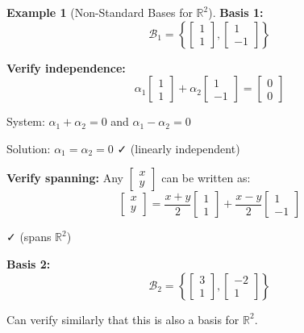 \documentclass[12pt,a4paper]{article}
\theoremstyle{definition}
\newtheorem{example}{Example}[section]
\begin{document}
\begin{example}[Non-Standard Bases for $\mathbb{R}^2$]
\textbf{Basis 1:}
\begin{equation}
\mathcal{B}_1 = \left\{\begin{bmatrix} 1 \\ 1 \end{bmatrix}, \begin{bmatrix} 1 \\ -1 \end{bmatrix}\right\}
\end{equation}

\textbf{Verify independence:}
\begin{equation}
\alpha_1\begin{bmatrix} 1 \\ 1 \end{bmatrix} + \alpha_2\begin{bmatrix} 1 \\ -1 \end{bmatrix} = \begin{bmatrix} 0 \\ 0 \end{bmatrix}
\end{equation}

System: $\alpha_1 + \alpha_2 = 0$ and $\alpha_1 - \alpha_2 = 0$

Solution: $\alpha_1 = \alpha_2 = 0$ ✓ (linearly independent)

\textbf{Verify spanning:} Any $\begin{bmatrix} x \\ y \end{bmatrix}$ can be written as:
\begin{equation}
\begin{bmatrix} x \\ y \end{bmatrix} = \frac{x+y}{2}\begin{bmatrix} 1 \\ 1 \end{bmatrix} + \frac{x-y}{2}\begin{bmatrix} 1 \\ -1 \end{bmatrix}
\end{equation}

✓ (spans $\mathbb{R}^2$)

\textbf{Basis 2:}
\begin{equation}
\mathcal{B}_2 = \left\{\begin{bmatrix} 3 \\ 1 \end{bmatrix}, \begin{bmatrix} -2 \\ 1 \end{bmatrix}\right\}
\end{equation}

Can verify similarly that this is also a basis for $\mathbb{R}^2$.
\end{example}
\end{document}

